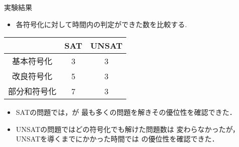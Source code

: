 \begin{frame}{実験結果}
 \begin{itemize}
  \item 各符号化に対して時間内の判定ができた数を比較する.
 \end{itemize}
 \begin{block}{}
  \begin{table}[ht]
   \centering
   \begin{tabular}{c|c|c}
    &SAT &UNSAT \\ \hline
    基本符号化 &3 &3 \\
    改良符号化 &5 &3 \\
    部分和符号化 &{\color{red}7} &3 \\ \hline
   \end{tabular}
  \end{table}
  \begin{itemize}
   \item SATの問題では，が
	 最も多くの問題を解きその優位性を確認できた．
   \item UNSATの問題ではどの符号化でも解けた問題数は
	 変わらなかったが，UNSATを導くまでにかかった時間では
	 の優位性を確認できた．
  \end{itemize}
 \end{block}
\end{frame}

\backupend